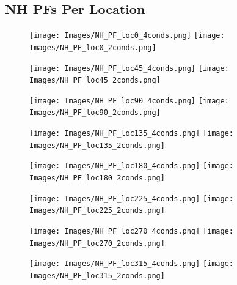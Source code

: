 \documentclass[11pt]{article} %
\begin{document}
\subsection{NH PFs Per Location}
\begin{figure}[H]
\centering %
\texttt{[image: Images/NH\_PF\_loc0\_4conds.png]}
\texttt{[image: Images/NH\_PF\_loc0\_2conds.png]}
\end{figure}
\begin{figure}[H]
\centering %
\texttt{[image: Images/NH\_PF\_loc45\_4conds.png]}
\texttt{[image: Images/NH\_PF\_loc45\_2conds.png]}
\end{figure}
\begin{figure}[H]
\centering %
\texttt{[image: Images/NH\_PF\_loc90\_4conds.png]}
\texttt{[image: Images/NH\_PF\_loc90\_2conds.png]}
\end{figure}
\begin{figure}[H]
\centering %
\texttt{[image: Images/NH\_PF\_loc135\_4conds.png]}
\texttt{[image: Images/NH\_PF\_loc135\_2conds.png]}
\end{figure}
\begin{figure}[H]
\centering %
\texttt{[image: Images/NH\_PF\_loc180\_4conds.png]}
\texttt{[image: Images/NH\_PF\_loc180\_2conds.png]}
\end{figure}
\begin{figure}[H]
\centering %
\texttt{[image: Images/NH\_PF\_loc225\_4conds.png]}
\texttt{[image: Images/NH\_PF\_loc225\_2conds.png]}
\end{figure}
\begin{figure}[H]
\centering %
\texttt{[image: Images/NH\_PF\_loc270\_4conds.png]}
\texttt{[image: Images/NH\_PF\_loc270\_2conds.png]}
\end{figure}
\begin{figure}[H]
\centering %
\texttt{[image: Images/NH\_PF\_loc315\_4conds.png]}
\texttt{[image: Images/NH\_PF\_loc315\_2conds.png]}
\end{figure}

\newpage
\end{document}
